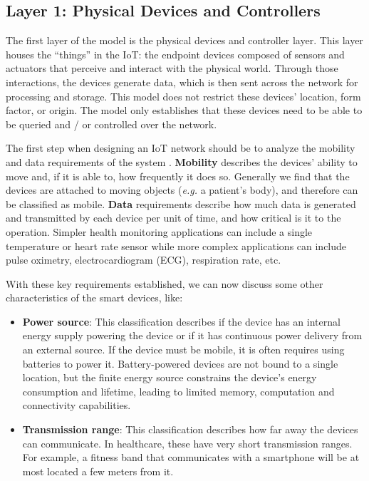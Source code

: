 \subsection{Layer 1: Physical Devices and Controllers}
\label{sec:iot-model-layer1}

The first layer of the model is the physical devices and controller layer. This layer houses the ``things'' in the \acl{IoT}: the endpoint devices composed of sensors and actuators that perceive and interact with the physical world. Through those interactions, the devices generate data, which is then sent across the network for processing and storage. This model does not restrict these devices' location, form factor, or origin. The model only establishes that these devices need to be able to be queried and / or controlled over the network.\bigskip

The first step when designing an IoT network should be to analyze the mobility and data requirements of the system \cite{10.5555/3161403}. \textbf{Mobility} describes the devices' ability to move and, if it is able to, how frequently it does so. Generally we find that the devices are attached to moving objects (\textit{e.g.} a patient's body), and therefore can be classified as mobile. \textbf{Data} requirements describe how much data is generated and transmitted by each device per unit of time, and how critical is it to the operation. Simpler health monitoring applications can include a single temperature or heart rate sensor while more complex applications can include pulse oximetry, electrocardiogram (\acs{ECG}), respiration rate, etc. \bigskip

With these key requirements established, we can now discuss some other characteristics of the smart devices, like:

\begin{itemize}
    \item \textbf{Power source}: This classification describes if the device has an internal energy supply powering the device or if it has continuous power delivery from an external source. If the device must be mobile, it is often requires using batteries to power it. Battery-powered devices are not bound to a single location, but the finite energy source constrains the device's energy consumption and lifetime, leading to limited memory, computation and connectivity capabilities. 
    \item \textbf{Transmission range}: This classification describes how far away the devices can communicate. In healthcare, these have very short transmission ranges. For example, a fitness band that communicates with a smartphone will be at most located a few meters from it.
\end{itemize}


